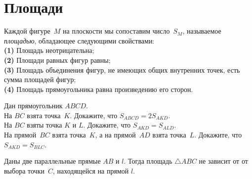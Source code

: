
\section*{Площади}


Каждой фигуре~$M$ на плоскости мы сопоставим число~$S_M$, называемое
\emph{площадью}, обладающее следующими свойствами:
\\
\textbf{(1)}\enspace
Площадь неотрицательна;
\\
\textbf{(2)}\enspace
Площади равных фигур равны;
\\
\textbf{(3)}\enspace
Площадь объединения фигур, не имеющих общих внутренних точек, есть сумма
площадей фигур;
\\
\textbf{(4)}\enspace
Площадь прямоугольника равна произведению его сторон.

\begin{problems}

\item
Дан прямоугольник $ABCD$.
\\
\sp
На $BC$ взята точка~$K$.
Докажите, что $S_{ABCD} = 2 S_{AKD}$.
\\
\sp
На $BC$ взяты точка $K$ и $L$.
Докажите, что $S_{AKD} = S_{ALD}$.
\\
\sp
На прямой~$BC$ взята точка~$K$, а на прямой~$AD$ взята точка~$L$.
Докажите, что $S_{AKD} = S_{BLC}$.

\end{problems}

Даны две параллельные прямые $AB$ и $l$.
Тогда площадь $\triangle ABC$ не зависит от от выбора точки~$C$, находящейся
на прямой $l$.

